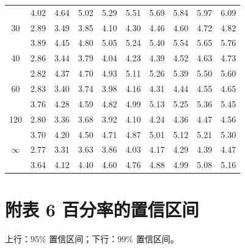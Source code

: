 \documentclass[lang=cn,10pt]{elegantbook}
\begin{document}
\begin{longtable}{c|ccccccccc}
      & 4.02 & 4.64 & 5.02 & 5.29 & 5.51 & 5.69 & 5.84 & 5.97 & 6.09 \\
    30 & 2.89 & 3.49 & 3.85 & 4.10 & 4.30 & 4.46 & 4.60 & 4.72 & 4.82 \\
      & 3.89 & 4.45 & 4.80 & 5.05 & 5.24 & 5.40 & 5.54 & 5.65 & 5.76 \\
    40 & 2.86 & 3.44 & 3.79 & 4.04 & 4.23 & 4.39 & 4.52 & 4.63 & 4.73 \\
      & 2.82 & 4.37 & 4.70 & 4.93 & 5.11 & 5.26 & 5.39 & 5.50 & 5.60 \\
    60 & 2.83 & 3.40 & 3.74 & 3.98 & 4.16 & 4.31 & 4.44 & 4.55 & 4.65 \\
      & 3.76 & 4.28 & 4.59 & 4.82 & 4.99 & 5.13 & 5.25 & 5.36 & 5.45 \\
    120 & 2.80 & 3.36 & 3.68 & 3.92 & 4.10 & 4.24 & 4.36 & 4.47 & 4.56 \\
      & 3.70 & 4.20 & 4.50 & 4.71 & 4.87 & 5.01 & 5.12 & 5.21 & 5.30 \\
    $\infty$ & 2.77 & 3.31 & 3.63 & 3.86 & 4.03 & 4.17 & 4.29 & 4.39 & 4.47 \\
      & 3.64 & 4.12 & 4.40 & 4.60 & 4.76 & 4.88 & 4.99 & 5.08 & 5.16 \\
    \hline
\end{longtable}

\newpage

\section{附表 6 百分率的置信区间}
\noindent
上行：95\% 置信区间；下行：99\% 置信区间。
\end{document}
